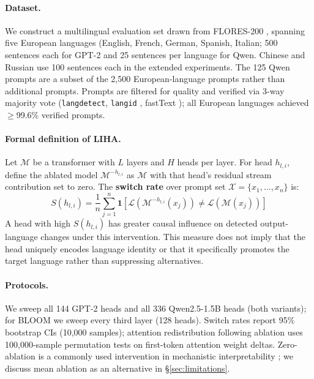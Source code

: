 \documentclass[11pt]{article}
\begin{document}
\paragraph{Dataset.} We construct a multilingual evaluation set drawn from
FLORES-200 \cite{nllbteam2022noLanguageLeftBehind}, spanning five European
languages (English, French, German, Spanish, Italian; 500 sentences each for GPT-2 and 25 sentences per language for Qwen. Chinese
and Russian use 100 sentences each in the extended experiments. The 125 Qwen prompts are a subset
of the 2,500 European-language prompts rather than additional prompts.
Prompts are filtered for quality and verified via 3-way majority vote
(\texttt{langdetect}, \texttt{langid} \citep{lui-baldwin-2012-langid}, fastText \citep{joulin2016fasttext});
all European languages achieved $\geq$99.6\% verified prompts.

\paragraph{Formal definition of LIHA.} Let $\mathcal{M}$ be a
transformer with $L$ layers and $H$ heads per layer. For head
$h_{l,i}$, define the ablated model $\mathcal{M}^{-h_{l,i}}$ as
$\mathcal{M}$ with that head's residual stream contribution set to
zero. The \textbf{switch rate} over prompt set
$\mathcal{X}=\{x_1,\ldots,x_n\}$ is:
\begin{equation}
    S(h_{l,i}) = \frac{1}{n} \sum_{j=1}^{n}
    \mathbf{1}\!\left[\mathcal{L}(\mathcal{M}^{-h_{l,i}}(x_j)) \neq
    \mathcal{L}(\mathcal{M}(x_j))\right]
    \label{eq:switch_rate}
\end{equation}
A head with high $S(h_{l,i})$ has greater causal influence on detected
output-language changes under this intervention. This measure does not imply
that the head uniquely encodes language identity or that it specifically
promotes the target language rather than suppressing alternatives.

\paragraph{Protocols.} We sweep all 144 GPT-2 heads and all 336
Qwen2.5-1.5B heads (both variants); for BLOOM we sweep every third layer
(128 heads). Switch rates report 95\% bootstrap CIs (10,000 samples);
attention redistribution following ablation uses 100,000-sample permutation
tests on first-token attention weight deltas. Zero-ablation is a commonly used
intervention in mechanistic interpretability
\citep{elhage2021, wang2022interpretability}; we discuss mean ablation
as an alternative in \S\ref{sec:limitations}.
\end{document}
